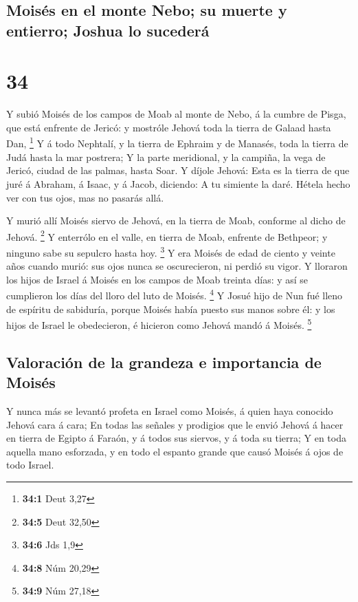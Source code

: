 \hypertarget{moisuxe9s-en-el-monte-nebo-su-muerte-y-entierro-joshua-lo-sucederuxe1}{%
\subsection{Moisés en el monte Nebo; su muerte y entierro; Joshua lo
sucederá}\label{moisuxe9s-en-el-monte-nebo-su-muerte-y-entierro-joshua-lo-sucederuxe1}}

\hypertarget{section-33}{%
\section{34}\label{section-33}}

 Y subió Moisés de los campos de Moab al monte de Nebo, á la
cumbre de Pisga, que está enfrente de Jericó: y mostróle Jehová toda la
tierra de Galaad hasta Dan, \footnote{\textbf{34:1} Deut 3,27}
 Y á todo Nephtalí, y la tierra de Ephraim y de Manasés,
toda la tierra de Judá hasta la mar postrera;  Y la parte
meridional, y la campiña, la vega de Jericó, ciudad de las palmas, hasta
Soar.  Y díjole Jehová: Esta es la tierra de que juré á
Abraham, á Isaac, y á Jacob, diciendo: A tu simiente la daré. Hétela
hecho ver con tus ojos, mas no pasarás allá.

 Y murió allí Moisés siervo de Jehová, en la tierra de Moab,
conforme al dicho de Jehová. \footnote{\textbf{34:5} Deut 32,50}
 Y enterrólo en el valle, en tierra de Moab, enfrente de
Bethpeor; y ninguno sabe su sepulcro hasta hoy. \footnote{\textbf{34:6}
  Jds 1,9}  Y era Moisés de edad de ciento y veinte años
cuando murió: sus ojos nunca se oscurecieron, ni perdió su vigor.
 Y lloraron los hijos de Israel á Moisés en los campos de
Moab treinta días: y así se cumplieron los días del lloro del luto de
Moisés. \footnote{\textbf{34:8} Núm 20,29}  Y Josué hijo de
Nun fué lleno de espíritu de sabiduría, porque Moisés había puesto sus
manos sobre él: y los hijos de Israel le obedecieron, é hicieron como
Jehová mandó á Moisés. \footnote{\textbf{34:9} Núm 27,18}

\hypertarget{valoraciuxf3n-de-la-grandeza-e-importancia-de-moisuxe9s}{%
\subsection{Valoración de la grandeza e importancia de
Moisés}\label{valoraciuxf3n-de-la-grandeza-e-importancia-de-moisuxe9s}}

 Y nunca más se levantó profeta en Israel como Moisés, á
quien haya conocido Jehová cara á cara;  En todas las
señales y prodigios que le envió Jehová á hacer en tierra de Egipto á
Faraón, y á todos sus siervos, y á toda su tierra;  Y en
toda aquella mano esforzada, y en todo el espanto grande que causó
Moisés á ojos de todo Israel.
